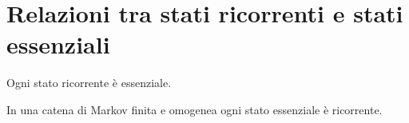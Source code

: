 \documentclass[\main/main.tex]{subfiles}
\begin{document}
\section{Relazioni tra stati ricorrenti e stati essenziali}
\begin{theorem}
  Ogni stato ricorrente è essenziale.
\end{theorem}

\begin{theorem}
  In una catena di Markov finita e omogenea ogni stato essenziale è ricorrente.
\end{theorem}
\end{document}

